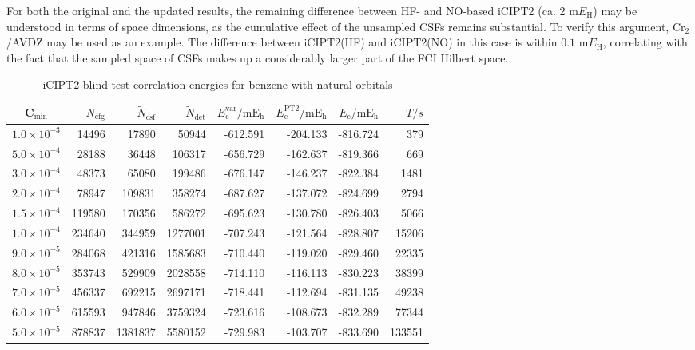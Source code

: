 \documentclass[journal=jcp,manuscript=suppinfo]{achemso}
\begin{document}
For both the original and the updated results, the remaining difference between HF- and NO-based iCIPT2 (ca. 2 m$E_{\text{H}}$) may be understood in terms of space dimensions, as the cumulative effect of the unsampled CSFs remains substantial. To verify this argument, Cr$_2$/AVDZ may be used as an example. The difference between iCIPT2(HF) and iCIPT2(NO) in this case is within $0.1$ m$E_{\text{H}}$, correlating with the fact that the sampled space of CSFs makes up a considerably larger part of the FCI Hilbert space.

\begin{table}[!htp]
	\small
\caption{iCIPT2 blind-test correlation energies for benzene with natural orbitals }
	\begin{threeparttable}
		\centering
	\begin{tabular}{c|rrrrrrr}\toprule
		C$_{\text{min}}$&$N_{\mathrm{cfg}}$&$\tilde{N}_{\mathrm{csf}}$\tnote{a}&$\tilde{N}_{\mathrm{det}}$\tnote{b}
		&$E_{\mathrm{c}}^{\mathrm{var}}/\mathrm{mE_h}$&$E_{\mathrm{c}}^{\mathrm{PT2}}/\mathrm{mE_h}$&$E_{\mathrm{c}}/\mathrm{mE_h}$&$T/s$\tnote{c}\\\toprule
			$1.0\times10^{-3}$ &    14496 &    17890 &  50944&  -612.591  &  -204.133&  -816.724 &379\\
			$5.0\times10^{-4}$ &    28188 &    36448 & 106317&  -656.729  &  -162.637&  -819.366 &669\\
			$3.0\times10^{-4}$ &    48373 &    65080 & 199486&  -676.147  &  -146.237&  -822.384 &1481\\
			$2.0\times10^{-4}$ &    78947 &   109831 & 358274&  -687.627  &  -137.072&  -824.699 &2794\\
			$1.5\times10^{-4}$ &   119580 &   170356 & 586272&  -695.623  &  -130.780&  -826.403 &5066\\
			$1.0\times10^{-4}$ &   234640 &   344959 &1277001&  -707.243  &  -121.564&  -828.807 &15206\\
			$9.0\times10^{-5}$ &   284068 &   421316 &1585683&  -710.440  &  -119.020&  -829.460 &22335\\
			$8.0\times10^{-5}$ &   353743 &   529909 &2028558&  -714.110  &  -116.113&  -830.223 &38399\\
			$7.0\times10^{-5}$ &   456337 &   692215 &2697171&  -718.441  &  -112.694&  -831.135 &49238\\
			$6.0\times10^{-5}$ &   615593 &   947846 &3759324&  -723.616  &  -108.673&  -832.289 &77344\\
			$5.0\times10^{-5}$ &   878837 &  1381837 &5580152&  -729.983  &  -103.707&  -833.690 &133551\\\midrule

\end{tabular}
\end{threeparttable}
\end{table}
\end{document}
